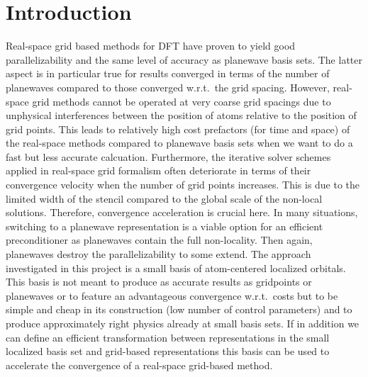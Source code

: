 \documentclass[oribibl]{llncs}
\begin{document}
\section{Introduction} \label{sec:intro}
%
Real-space grid based methods for \ac{DFT}
have proven to yield good parallelizability and the same level of
accuracy as \ac{planewave} basis sets.
The latter aspect is in particular true for results converged
in terms of the number of \acp{planewave} compared to those converged
w.r.t.~the grid spacing.
However, real-space grid methods cannot be operated at very coarse
grid spacings due to unphysical interferences between the position
of atoms relative to the position of grid points.
This leads to relatively high cost prefactors (for time and space)
of the real-space methods compared to \ac{planewave} basis sets
when we want to do a fast but less accurate calcuation.
Furthermore, the iterative solver schemes applied in real-space
grid formalism often deteriorate in terms of their convergence
velocity when the number of grid points increases.
This is due to the limited width of the stencil compared to the 
global scale of the non-local solutions.
Therefore, convergence acceleration is crucial here.
In many situations, switching to a \ac{planewave} representation
is a viable option for an efficient preconditioner as
\acp{planewave} contain the full non-locality.
Then again, \acp{planewave} destroy the parallelizability
to some extend.
The approach investigated in this project is a small basis of atom-centered
localized orbitals.
This basis is not meant to produce as accurate results as \acp{gridpoint} or \acp{planewave}
or to feature an advantageous convergence w.r.t.~costs
but to be simple and cheap in its construction (low number of control parameters)
and to produce approximately right physics already at small basis sets.
If in addition we can define an efficient transformation between
representations in
the small localized basis set and grid-based representations
this basis can be used to accelerate
the convergence of a real-space grid-based method.

\end{document}
